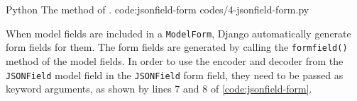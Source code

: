 \listing
{Python}
{The  method of .}
{code:jsonfield-form}
{codes/4-jsonfield-form.py}

When model fields are included in a \verb|ModelForm|, Django automatically
generate form fields for them. The form fields are generated by calling the
\verb|formfield()| method of the model fields. In order to use the encoder and
decoder from the \verb|JSONField| model field in the \verb|JSONField| form
field, they need to be passed as keyword arguments, as shown by lines 7 and 8
of \autoref{code:jsonfield-form}.
